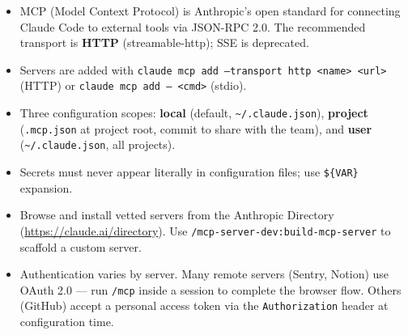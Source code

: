 \begin{summarybox}
\begin{itemize}
  \item MCP (Model Context Protocol) is Anthropic's open standard for
        connecting Claude Code to external tools via JSON-RPC 2.0. The
        recommended transport is \textbf{HTTP} (streamable-http); SSE is
        deprecated.
  \item Servers are added with \texttt{claude mcp add --transport http <name>
        <url>} (HTTP) or \texttt{claude mcp add -- <cmd>} (stdio).
  \item Three configuration scopes: \textbf{local} (default,
        \texttt{\textasciitilde/.claude.json}), \textbf{project}
        (\texttt{.mcp.json} at project root, commit to share with the team),
        and \textbf{user} (\texttt{\textasciitilde/.claude.json}, all
        projects).
  \item Secrets must never appear literally in configuration files; use
        \texttt{\$\{VAR\}} expansion.
  \item Browse and install vetted servers from the Anthropic Directory
        (\url{https://claude.ai/directory}). Use
        \texttt{/mcp-server-dev:build-mcp-server} to scaffold a custom server.
  \item Authentication varies by server. Many remote servers (Sentry,
        Notion) use OAuth 2.0 — run \texttt{/mcp} inside a session to
        complete the browser flow. Others (GitHub) accept a personal
        access token via the \texttt{Authorization} header at
        configuration time.
\end{itemize}
\end{summarybox}

\nocite{*}
\printbibliography[heading=subbibliography,title={References}]
